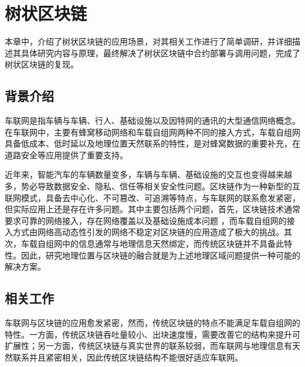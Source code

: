 %
%
%
%
%
%
\chapter{树状区块链}
本章中，介绍了树状区块链的应用场景，对其相关工作进行了简单调研，并详细描述其具体研究内容与原理，最终解决了树状区块链中合约部署与调用问题，完成了树状区块链的复现。
\section{背景介绍}
车联网是指车辆与车辆、行人、基础设施以及因特网的通讯的大型通信网络概念。在车联网中，主要有蜂窝移动网络和车载自组网两种不同的接入方式，车载自组网具备低成本、低时延以及地理位置天然联系的特性，是对蜂窝数据的重要补充，在道路安全等应用提供了重要支持\cite{klapez2020application}。

近年来，智能汽车的车辆数量变多，车辆与车辆、基础设施的交互也变得越来越多，势必导致数据安全、隐私、信任等相关安全性问题\cite{汤立波2019车联网产业融合发展趋势,VN2020}。区块链作为一种新型的互联网模式，具备去中心化、不可篡改、可追溯等特点，与车联网的联系愈发紧密，但实际应用上还是存在许多问题\cite{mollah2020blockchain}。其中主要包括两个问题，首先，区块链技术通常要求可靠的网络接入，存在网络覆盖以及基础设施成本问题 ，而车载自组网的接入方式由网络高动态性引发的网络不稳定对区块链的应用造成了极大的挑战。其次，车载自组网中的信息通常与地理信息天然绑定，而传统区块链并不具备此特性。因此，研究地理位置与区块链的融合就是为上述地理区域问题提供一种可能的解决方案。

\section{相关工作}
车联网与区块链的应用愈发紧密，然而，传统区块链的特点不能满足车载自组网的特性。一方面，传统区块链吞吐量较小、出块速度慢，需要改善它的结构来提升可扩展性；另一方面，传统区块链与真实世界的联系较弱，而车联网与地理信息有天然联系并且紧密相关，因此传统区块链结构不能很好适应车联网\cite{wagner2018cyber}。

